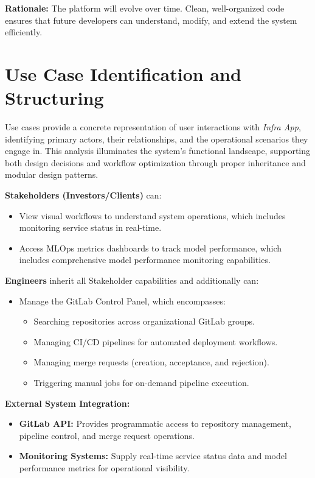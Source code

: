 \textbf{Rationale:} The platform will evolve over time. Clean, well-organized code ensures that future developers can understand, modify, and extend the system efficiently.
\clearpage

\section{Use Case Identification and Structuring}
Use cases provide a concrete representation of user interactions with \textit{Infra App}, identifying primary actors, their relationships, and the operational scenarios they engage in. This analysis illuminates the system's functional landscape, supporting both design decisions and workflow optimization through proper inheritance and modular design patterns.

\textbf{Stakeholders (Investors/Clients)} can:
\begin{itemize}
    \item View visual workflows to understand system operations, which includes monitoring service status in real-time.
    \item Access MLOps metrics dashboards to track model performance, which includes comprehensive model performance monitoring capabilities.
\end{itemize}

\textbf{Engineers} inherit all Stakeholder capabilities and additionally can:
\begin{itemize}
    \item Manage the GitLab Control Panel, which encompasses:
    \begin{itemize}
        \item Searching repositories across organizational GitLab groups.
        \item Managing CI/CD pipelines for automated deployment workflows.
        \item Managing merge requests (creation, acceptance, and rejection).
        \item Triggering manual jobs for on-demand pipeline execution.
    \end{itemize}
\end{itemize}

\textbf{External System Integration:}
\begin{itemize}
    \item \textbf{GitLab API:} Provides programmatic access to repository management, pipeline control, and merge request operations.
    \item \textbf{Monitoring Systems:} Supply real-time service status data and model performance metrics for operational visibility.
\end{itemize}

